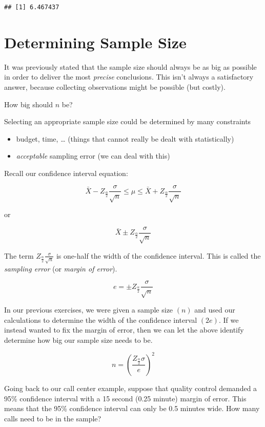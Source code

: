 \documentclass[
]{book}
\begin{document}
\begin{verbatim}
## [1] 6.467437
\end{verbatim}

\section{Determining Sample Size}\label{determining-sample-size}

It was previously stated that the sample size should always be as big as possible in order to deliver the most \emph{precise} conclusions. This isn't always a satisfactory answer, because collecting observations might be possible (but costly).

How big should \(n\) be?

Selecting an appropriate sample size could be determined by many constraints

\begin{itemize}
\item
  budget, time, \ldots{} (things that cannot really be dealt with statistically)
\item
  \emph{acceptable} sampling error (we can deal with this)
\end{itemize}

Recall our confidence interval equation:

\[\bar{X}-Z_{\frac{\alpha}{2}}\frac{\sigma}{\sqrt{n}} \leq \mu \leq \bar{X}+Z_{\frac{\alpha}{2}}\frac{\sigma}{\sqrt{n}}\]

or

\[\bar{X} \pm Z_{\frac{\alpha}{2}}\frac{\sigma}{\sqrt{n}}\]

The term \(Z_{\frac{\alpha}{2}}\frac{\sigma}{\sqrt{n}}\) is one-half the width of the confidence interval. This is called the \emph{sampling error} (or \emph{margin of error}).

\[e = \pm Z_{\frac{\alpha}{2}}\frac{\sigma}{\sqrt{n}}\]

In our previous exercises, we were given a sample size \((n)\) and used our calculations to determine the width of the confidence interval \((2e)\). If we instead wanted to fix the margin of error, then we can let the above identify determine how big our sample size needs to be.

\[n = \left( \frac{Z_{\frac{\alpha}{2}}\sigma}{e}\right)^2\]

Going back to our call center example, suppose that quality control demanded a 95\% confidence interval with a 15 second (0.25 minute) margin of error. This means that the 95\% confidence interval can only be 0.5 minutes wide. How many calls need to be in the sample?
\end{document}

